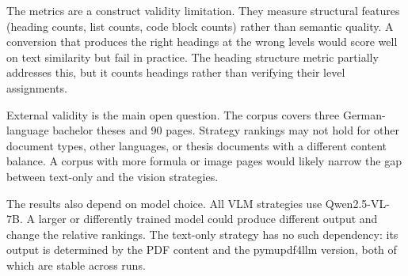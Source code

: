 The metrics are a construct validity limitation. They measure structural
features (heading counts, list counts, code block counts) rather than
semantic quality. A conversion that produces the right headings at the wrong
levels would score well on text similarity but fail in practice. The heading
structure metric partially addresses this, but it counts headings rather than
verifying their level assignments.

External validity is the main open question. The corpus covers three
German-language bachelor theses and 90 pages. Strategy rankings may not hold
for other document types, other languages, or thesis documents with a different
content balance. A corpus with more formula or image pages would likely narrow
the gap between text-only and the vision strategies.

The results also depend on model choice. All VLM strategies use Qwen2.5-VL-7B.
A larger or differently trained model could produce different output and change
the relative rankings. The text-only strategy has no such dependency: its
output is determined by the PDF content and the pymupdf4llm version, both of
which are stable across runs.
